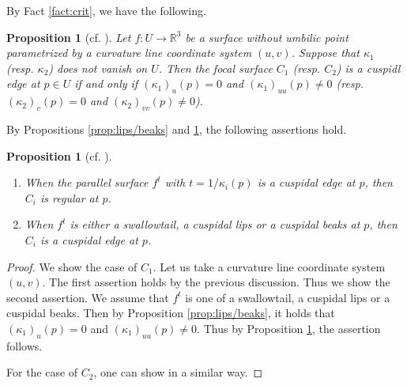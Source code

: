 \documentclass[11pt,a4paper,pdflatex,final]{amsart}
\theoremstyle{plain}
\newtheorem{proposition}[theorem]{Proposition}%
\theoremstyle{definition}
\theoremstyle{remark}
\newcommand{\0}{\bm{0}}
\newcommand{\R}{\mathbb{R}}
\newcommand{\be}{\bm{e}}
\newcommand{\til}{\tilde}
\numberwithin{equation}{section}
\begin{document}
{By Fact \ref{fact:crit}, we have the following.

\begin{proposition}[cf. {\cite[Theorem 7.1.1]{usy-book}}]\label{prop:sing-C}
	Let $f\colon U\to\R^3$ be a surface without umbilic point 
	parametrized by a curvature line coordinate system $(u,v)$. 
	Suppose that $\kappa_1$ \textup{(}resp. $\kappa_2$\textup{)} 
	does not vanish on $U$. 
	Then the focal surface $C_1$ \textup{(}resp. $C_2$\textup{)}
	is a cuspidl edge at $p\in U$ 
	if and only if $(\kappa_1)_u(p)=0$ and $(\kappa_1)_{uu}(p)\neq0$ 
	\textup{(}resp. $(\kappa_2)_v(p)=0$ and $(\kappa_2)_{vv}(p)\neq0$\textup{)}. 
\end{proposition}
By Propositions \ref{prop:lips/beaks} and \ref{prop:sing-focal}, 
the following assertions hold. 
}
\begin{proposition}[cf. \cite{tera2}]\label{prop:sing-focal}
\begin{enumerate}[label={\rm(\arabic*)}]
	\item When the parallel surface $f^t$ with $t=1/\kappa_i(p)$ 
	is a cuspidal edge at $p$, then $C_i$ is regular at $p$. 
	\item When $f^t$ is either a swallowtail, a cuspidal lips 
	or a cuspidal beaks at $p$, then $C_i$ is a cuspidal edge at $p$. 
\end{enumerate} 
\end{proposition}

\begin{proof}%
We show the case of $C_1$. 
Let us take a curvature line coordinate system $(u,v)$. 
{The first assertion holds by the previous discussion.} 
{Thus we show the second assertion.} 
We assume that $f^t$ is one of a swallowtail, a cuspidal lips or a cuspidal beaks. 
Then by Proposition \ref{prop:lips/beaks}, it holds that 
{$(\kappa_1)_u(p)=0$ and $(\kappa_1)_{uu}(p)\neq0$}. 
{Thus by Proposition \ref{prop:sing-C}, 
	the assertion follows.}

For the case of $C_2$, one can show in a similar way. 
\end{proof}
\end{document}
